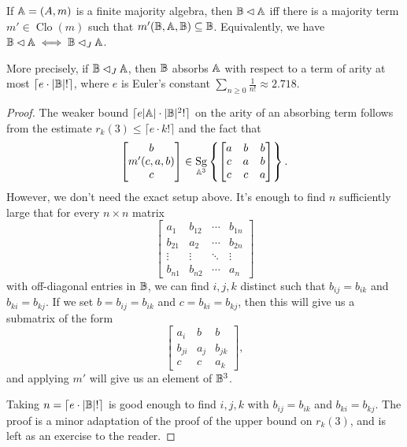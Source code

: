 \documentclass[letterpaper,11pt]{article}
\DeclareMathOperator{\Clo}{Clo}
\DeclareMathOperator{\Sg}{Sg}
\begin{document}
\begin{cor} If $\mathbb{A} = (A,m)$ is a finite majority algebra, then $\mathbb{B} \lhd \mathbb{A}$ iff there is a majority term $m' \in \Clo(m)$ such that $m'(\mathbb{B},\mathbb{A},\mathbb{B}) \subseteq \mathbb{B}$. Equivalently, we have $\mathbb{B} \lhd \mathbb{A} \iff \mathbb{B} \lhd_J \mathbb{A}$.

More precisely, if $\mathbb{B} \lhd_J \mathbb{A}$, then $\mathbb{B}$ absorbs $\mathbb{A}$ with respect to a term of arity at most $\lceil e\cdot |\mathbb{B}|!\rceil$, where $e$ is Euler's constant $\sum_{n \ge 0} \frac{1}{n!} \approx 2.718$.
\end{cor}
\begin{proof} The weaker bound $\lceil e|\mathbb{A}|\cdot |\mathbb{B}|^2!\rceil$ on the arity of an absorbing term follows from the estimate $r_k(3) \le \lceil e\cdot k!\rceil$ and the fact that
\[
\begin{bmatrix}b\\ m'(c,a,b)\\ c\end{bmatrix} \in \Sg_{\bA^3}\left\{\begin{bmatrix} a & b & b\\ c & a & b\\ c & c & a\end{bmatrix}\right\}.
\]
However, we don't need the exact setup above. It's enough to find $n$ sufficiently large that for every $n\times n$ matrix
\[
\begin{bmatrix} a_1 & b_{12} & \cdots & b_{1n}\\ b_{21} & a_2 & \cdots & b_{2n}\\ \vdots & \vdots & \ddots & \vdots\\ b_{n1} & b_{n2} & \cdots & a_n\end{bmatrix}
\]
with off-diagonal entries in $\mathbb{B}$, we can find $i,j,k$ distinct such that $b_{ij} = b_{ik}$ and $b_{ki} = b_{kj}$. If we set $b = b_{ij} = b_{ik}$ and $c = b_{ki} = b_{kj}$, then this will give us a submatrix of the form
\[
\begin{bmatrix} a_i & b & b\\ b_{ji} & a_j & b_{jk}\\ c & c & a_k\end{bmatrix},
\]
and applying $m'$ will give us an element of $\mathbb{B}^3$.

Taking $n = \lceil e\cdot |\mathbb{B}|!\rceil$ is good enough to find $i,j,k$ with $b_{ij} = b_{ik}$ and $b_{ki} = b_{kj}$. The proof is a minor adaptation of the proof of the upper bound on $r_k(3)$, and is left as an exercise to the reader.
\end{proof}
\end{document}
